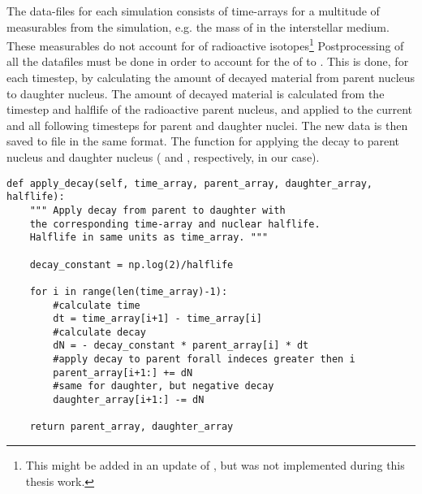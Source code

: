 \label{sec:mod-betadecay}

The data-files for each simulation consists of time-arrays for a multitude of measurables from the simulation, e.g. the mass of  in the interstellar medium.
These measurables do not account for \betadecay of radioactive isotopes\footnote{This might be added in an update of \omegamodel, but was not implemented during this thesis work.}
Postprocessing of all the datafiles must be done in order to account for the \betadecay of  to .
This is done, for each timestep, by calculating the amount of decayed material from parent nucleus to daughter nucleus. The amount of decayed material is calculated from the timestep and halflife of the radioactive parent nucleus, and applied to the current and all following timesteps for parent and daughter nuclei.
The new data is then saved to file in the same format.
The function for applying the decay to parent nucleus and daughter nucleus ( and , respectively, in our case).

\begin{lstlisting}[style=custompython, caption={Some caption}]
def apply_decay(self, time_array, parent_array, daughter_array, halflife):
    """ Apply decay from parent to daughter with 
    the corresponding time-array and nuclear halflife.
    Halflife in same units as time_array. """

    decay_constant = np.log(2)/halflife

    for i in range(len(time_array)-1):
        #calculate time
        dt = time_array[i+1] - time_array[i]
        #calculate decay
        dN = - decay_constant * parent_array[i] * dt
        #apply decay to parent forall indeces greater then i
        parent_array[i+1:] += dN
        #same for daughter, but negative decay
        daughter_array[i+1:] -= dN

    return parent_array, daughter_array
\end{lstlisting}
